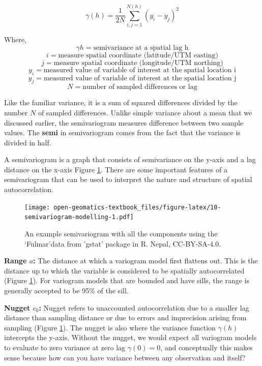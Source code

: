 \documentclass[
]{book}
\begin{document}
\[\gamma{(h)}=\frac{1}{2N}\sum_{i,j=1}^{N(h)}{({y_i}-y_j)}^2\]

Where, \[\gamma{h}=\text{semivariance at a spatial lag h}\]
\[ i=\text{measure spatial coordinate (latitude/UTM easting)}\]
\[ j=\text{measure spatial coordinate (longitude/UTM northing)}\]
\[y_{i}=\text{measured value of variable of interest at the spatial location i} \]
\[y_{j}=\text{measured value of variable of interest at the spatial location j} \]
\[N=\text{number of sampled differences or lag} \]

Like the familiar variance, it is a sum of squared differences divided by the number \(N\) of sampled differences. Unlike simple variance about a mean that we discussed earlier, the semivariogram measures difference between two sample values. The \textbf{semi} in semivariogram comes from the fact that the variance is divided in half.

A semivariogram is a graph that consists of semivariance on the y-axis and a lag distance on the x-axis Figure \ref{fig:10-semivariogram-modelling}. There are some important features of a semivariogram that can be used to interpret the nature and structure of spatial autocorrelation.

\begin{figure}
\centering
\texttt{[image: open-geomatics-textbook\_files/figure-latex/10-semivariogram-modelling-1.pdf]}
\caption{\label{fig:10-semivariogram-modelling}An example semivariogram with all the components using the `Fulmar'data from 'gstat' package in R. Nepal, CC-BY-SA-4.0.}
\end{figure}

\textbf{Range \(a\):} The distance at which a variogram model first flattens out. This is the distance up to which the variable is considered to be spatially autocorrelated (Figure \ref{fig:10-semivariogram-modelling}). For variogram models that are bounded and have sills, the range is generally accepted to be 95\% of the sill.

\textbf{Nugget \(c_0\):} Nugget refers to unaccounted autocorrelation due to a smaller lag distance than sampling distance or due to errors and imprecision arising from sampling (Figure \ref{fig:10-semivariogram-modelling}). The nugget is also where the variance function \(\gamma{(h)}\) intercepts the y-axis. Without the nugget, we would expect all variogram models to evaluate to zero variance at zero lag \(\gamma{(0)}=0\), and conceptually this makes sense because how can you have variance between any observation and itself?
\end{document}
